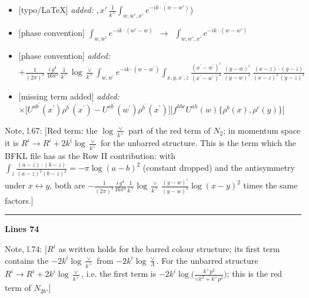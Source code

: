 \documentclass[10pt]{article}
\newenvironment{notebox}{\def\FrameCommand{{\color{notebar}\vrule width 1.5pt}\hspace{6pt}}\MakeFramed{\advance\hsize-\width\FrameRestore}\small}{\endMakeFramed}
\begin{document}
\begin{itemize}[leftmargin=2.2em,itemsep=1pt,topsep=2pt]
\item[\textbf{l.63}] \textsf{\small [typo/LaTeX]} \emph{added:} $\displaystyle ,x'$$\displaystyle \,\frac{1}{k^{+}}\int_{w,w',x'} e^{-ik\cdot(w-w')}${\color{gray}\small)}
\item[\textbf{l.63}] \textsf{\small [phase convention]} $\displaystyle \int_{w,w'} e^{-ik\cdot(w'-w)}$\ $\longrightarrow$\ $\displaystyle \int_{w,w',x'} e^{-ik\cdot(w-w')}$
\item[\textbf{l.66}] \textsf{\small [phase convention]} \emph{added:} $\displaystyle +\frac{1}{(2\pi)^{3}}\,\frac{i\,g^{4}}{16\pi^{5}}\,\frac{1}{k^{+}}\,\log\frac{\vee}{k^{+}}\int_{w,w^{\prime}} e^{-ik\cdot(w-w^{\prime})}\int_{x,y,x^{\prime},z}\frac{(x^{\prime}-w^{\prime})^{i}}{(x^{\prime}-w^{\prime})^{2}}\,\frac{(y-w)^{i}}{(y-w)^{2}}\,\frac{(x-z)\cdot(y-z)}{(x-z)^{2}\,(y-z)^{2}}$
\item[\textbf{l.66}] \textsf{\small [missing term added]} \emph{added:} $\displaystyle \times\Big[U^{ab^{\prime}}(x^{\prime})\rho^{b^{\prime}}(x^{\prime})-U^{ab^{\prime}}(w^{\prime})\rho^{b^{\prime}}(x^{\prime})\Big]\Big[f^{hbc}U^{ah}(w)\{\rho^{b}(x),\rho^{c}(y)\}\Big]$
\end{itemize}
\begin{notebox}\textsf{\small Note, l.67:} [Red term: the $\log\frac{\vee}{k^{+}}$ part of the red term of $N_{2}$; in momentum space it is $R^{i}\to R^{i}+2k^{i}\log\frac{\vee}{k^{+}}$ for the unbarred structure. This is the term which the BFKL file has as the Row II contribution: with $\int_{z}\frac{(a-z)\cdot(b-z)}{(a-z)^{2}(b-z)^{2}}=-\pi\log(a-b)^{2}$ (constant dropped) and the antisymmetry under $x\leftrightarrow y$, both are $-\frac{1}{(2\pi)^{3}}\frac{i\,g^{4}}{16\pi^{4}}\frac{1}{k^{+}}\log\frac{\vee}{k^{+}}\,\frac{(y-w)^{i}}{(y-w)^{2}}\log(x-y)^{2}$ times the same factors.]\end{notebox}
\noindent\rule{\linewidth}{0.3pt}\par\noindent\textbf{Lines 74}\par
\begin{notebox}\textsf{\small Note, l.74:} [$R^{i}$ as written holds for the barred colour structure; its first term contains the $-2k^{i}\log\frac{\vee}{k^{+}}$ from $-2k^{i}\log\frac{\vee}{\Lambda}$. For the unbarred structure $R^{i}\to R^{i}+2k^{i}\log\frac{\vee}{k^{+}}$, i.e. the first term is $-2k^{i}\log\Big(\frac{k^{+}p^{2}}{\vee k^{2}+k^{+}p^{2}}\Big)$; this is the red term of $N_{2b}$.]\end{notebox}
\end{document}

